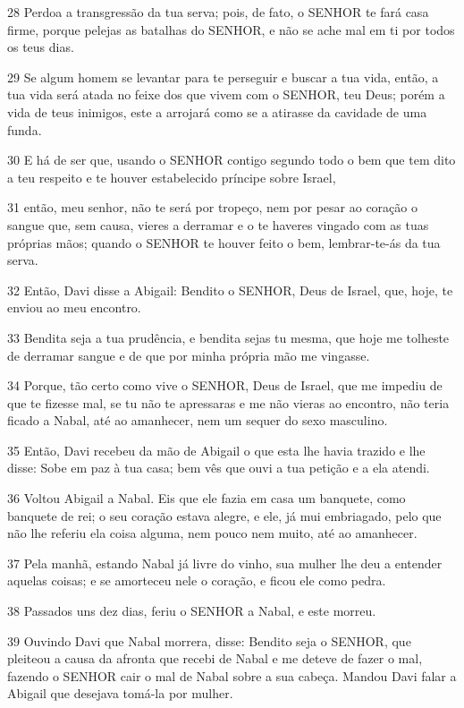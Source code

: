 \par 28 Perdoa a transgressão da tua serva; pois, de fato, o SENHOR te fará casa firme, porque pelejas as batalhas do SENHOR, e não se ache mal em ti por todos os teus dias.
\par 29 Se algum homem se levantar para te perseguir e buscar a tua vida, então, a tua vida será atada no feixe dos que vivem com o SENHOR, teu Deus; porém a vida de teus inimigos, este a arrojará como se a atirasse da cavidade de uma funda.
\par 30 E há de ser que, usando o SENHOR contigo segundo todo o bem que tem dito a teu respeito e te houver estabelecido príncipe sobre Israel,
\par 31 então, meu senhor, não te será por tropeço, nem por pesar ao coração o sangue que, sem causa, vieres a derramar e o te haveres vingado com as tuas próprias mãos; quando o SENHOR te houver feito o bem, lembrar-te-ás da tua serva.
\par 32 Então, Davi disse a Abigail: Bendito o SENHOR, Deus de Israel, que, hoje, te enviou ao meu encontro.
\par 33 Bendita seja a tua prudência, e bendita sejas tu mesma, que hoje me tolheste de derramar sangue e de que por minha própria mão me vingasse.
\par 34 Porque, tão certo como vive o SENHOR, Deus de Israel, que me impediu de que te fizesse mal, se tu não te apressaras e me não vieras ao encontro, não teria ficado a Nabal, até ao amanhecer, nem um sequer do sexo masculino.
\par 35 Então, Davi recebeu da mão de Abigail o que esta lhe havia trazido e lhe disse: Sobe em paz à tua casa; bem vês que ouvi a tua petição e a ela atendi.
\par 36 Voltou Abigail a Nabal. Eis que ele fazia em casa um banquete, como banquete de rei; o seu coração estava alegre, e ele, já mui embriagado, pelo que não lhe referiu ela coisa alguma, nem pouco nem muito, até ao amanhecer.
\par 37 Pela manhã, estando Nabal já livre do vinho, sua mulher lhe deu a entender aquelas coisas; e se amorteceu nele o coração, e ficou ele como pedra.
\par 38 Passados uns dez dias, feriu o SENHOR a Nabal, e este morreu.
\par 39 Ouvindo Davi que Nabal morrera, disse: Bendito seja o SENHOR, que pleiteou a causa da afronta que recebi de Nabal e me deteve de fazer o mal, fazendo o SENHOR cair o mal de Nabal sobre a sua cabeça. Mandou Davi falar a Abigail que desejava tomá-la por mulher.
